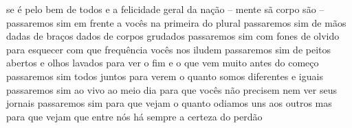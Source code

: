 \begin{poem}
\begin{stanza}
se é pelo bem de todos\verseline
e a felicidade geral da nação\verseline
– mente sã\verseline
\quad corpo são –\verseline
\qquad passaremos sim\verseline
\qquad em frente a vocês\verseline
\qquad na primeira do plural\verseline
passaremos sim\verseline
de mãos dadas\verseline
de braços dados\verseline
de corpos grudados\verseline
\qquad passaremos sim\verseline
\qquad com fones de olvido\verseline
\qquad para esquecer com que frequência\verseline
\qquad vocês nos iludem\verseline
passaremos sim\verseline
de peitos abertos\verseline
e olhos lavados\verseline
para ver o fim\verseline
e o que vem\verseline
muito antes do começo\verseline
\qquad passaremos sim\verseline
\qquad todos juntos\verseline
\qquad para verem o quanto somos\verseline
\qquad diferentes e iguais\verseline
passaremos sim\verseline
ao vivo ao meio dia\verseline
para que vocês não precisem\verseline
nem ver seus jornais\verseline
\qquad passaremos sim\verseline
\qquad para que vejam\verseline
\qquad o quanto odiamos\verseline
\qquad uns aos outros\verseline
mas para que vejam\verseline
que entre nós\verseline
há sempre a certeza\verseline
do perdão
\end{stanza}
\end{poem}